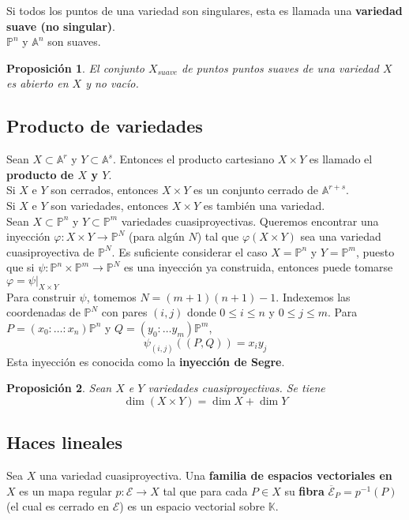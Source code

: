 \documentclass[12pt,a4paper]{report}
\newcommand{\ea}{\mathbb{A}^{n}}
\newcommand{\ep}{\mathbb{P}^{n}}
\newcommand{\K}{\mathbb{K}}
\newtheorem{prop}{Proposición}[chapter]
\begin{document}
Si todos los puntos de una variedad son singulares, esta es llamada una \textbf{variedad suave (no singular)}.\\
$\ep$ y $\ea$ son suaves.

\begin{prop}\label{2.1.34}
	El conjunto $ X_{suave} $ de puntos puntos suaves de una variedad $X$ es abierto en $X$ y no vacío.
\end{prop}


\subsection{Producto de variedades}
Sean $X \subset \mathbb{A}^{r}$ y $Y \subset \mathbb{A}^{s}$. Entonces el producto cartesiano $X \times Y$ es llamado el \textbf{producto de $X$ y $Y$}.\\

Si $X$ e $Y$ son cerrados, entonces $X \times Y $ es un conjunto cerrado de $\mathbb{A}^{r+s}$.\\
Si $X$ e $Y$ son variedades, entonces $X \times Y $ es también una variedad.\\

Sean $X \subset \mathbb{P}^n$ y $Y \subset \mathbb{P}^{m}$ variedades cuasiproyectivas. Queremos encontrar una inyección $\varphi: X \times Y \rightarrow \mathbb{P}^{N} $ (para algún $N$) tal que $\varphi(X \times Y)$ sea una variedad cuasiproyectiva de $\mathbb{P}^{N} $. Es suficiente considerar el caso $X = \ep$ y $Y= \mathbb{P}^{m}$, puesto que si $\psi : \ep \times \mathbb{P}^{m} \rightarrow \mathbb{P}^{N}$ es una inyección ya construida, entonces puede tomarse $\varphi=\psi|_{X \times Y}$\\

Para construir $\psi$, tomemos $N= (m+1)(n+1)-1$. Indexemos las coordenadas de $\mathbb{P}^{N}$ con pares $(i,j)$ donde $0\leq i \leq n$ y $0 \leq j \leq m$. Para $P=(x_{0}: \ldots : x_{n})\ep$ y $Q=(y_{0} : \ldots y_{m}) \mathbb{P}^{m}$, 
$$ \psi_{(i,j)}((P,Q))= x_{i}y_{j} $$
Esta inyección es conocida como la \textbf{inyección de Segre}.

\begin{prop}
	Sean $X$ e $Y$ variedades cuasiproyectivas. Se tiene $$ \dim(X \times Y) = \dim X + \dim Y $$
\end{prop}


\subsection{Haces lineales} 
Sea $X$ una variedad cuasiproyectiva. Una \textbf{familia de espacios vectoriales en $X$} es un mapa regular $p: \mathscr{E} \rightarrow X$ tal que para cada $P \in X$ su \textbf{fibra} $\overline{\mathscr{E}}_{P} = p^{-1}(P)$ (el cual es cerrado en $\mathscr{E}$) es un espacio vectorial sobre $\K$.\\
\end{document}
